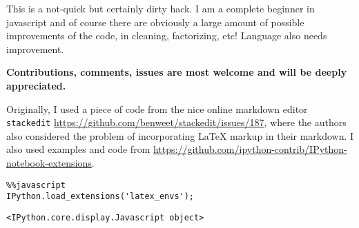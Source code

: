     This is a not-quick but certainly dirty hack. I am a complete beginner
in javascript and of course there are obviously a large amount of
possible improvements of the code, in cleaning, factorizing, etc!
Language also needs improvement.

\textbf{Contributions, comments, issues are most welcome and will be deeply appreciated.}

Originally, I used a piece of code from the nice online markdown editor
\texttt{stackedit}
\url{https://github.com/benweet/stackedit/issues/187}, where the authors
also considered the problem of incorporating LaTeX markup in their
markdown. I also used examples and code from
\url{https://github.com/ipython-contrib/IPython-notebook-extensions}.
\begin{lstlisting}
%%javascript 
IPython.load_extensions('latex_envs');
\end{lstlisting}%
%
    
    \begin{verbatim}
<IPython.core.display.Javascript object>
    \end{verbatim}

\begin{lstlisting}

\end{lstlisting}

    
    
%
%

    
    
